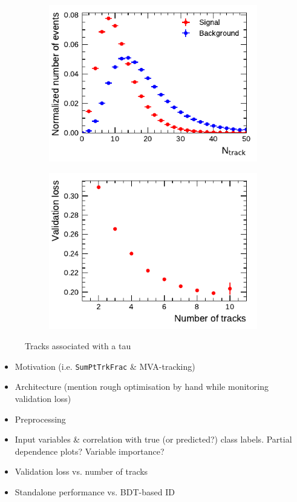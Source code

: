 \begin{figure}[ht]
  \begin{subfigure}[t]{0.5\textwidth}
    \centering
    \includegraphics{./figures/rnn/ntrk_1p.pdf}
  \end{subfigure}%
  \begin{subfigure}[t]{0.5\textwidth}
    \centering
    \includegraphics{./figures/rnn/nscan/track_1p.pdf}
  \end{subfigure}
  \caption{Tracks associated with a tau}
  \label{fig:rnn_ntracks}
\end{figure}

\begin{itemize}
\item Motivation (i.e. \texttt{SumPtTrkFrac} \& MVA-tracking)
\item Architecture (mention rough optimisation by hand while monitoring
  validation loss)
\item Preprocessing
\item Input variables \& correlation with true (or predicted?) class labels.
  Partial dependence plots? Variable importance?
\item Validation loss vs. number of tracks
\item Standalone performance vs. BDT-based ID
\end{itemize}

